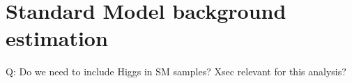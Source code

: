 \section{Standard Model background estimation}
\label{sec:background}

Q: Do we need to include Higgs in SM samples? Xsec relevant for this analysis?
